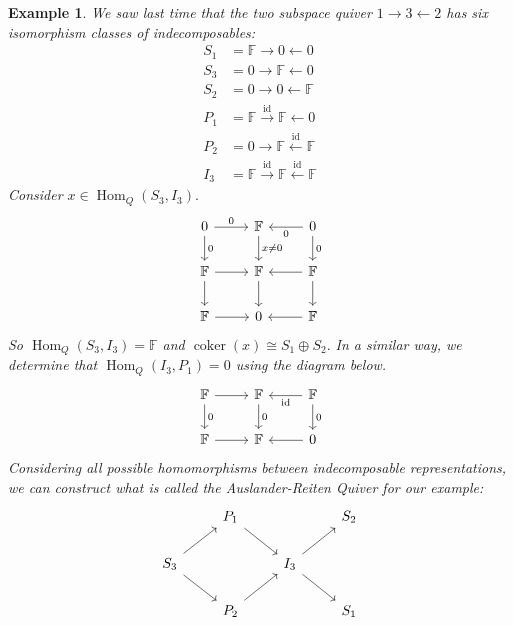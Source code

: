 \documentclass{book}
\newtheorem{example}{Example}[section]
\DeclareMathOperator{\Hom}{Hom}
\DeclareMathOperator{\coker}{coker}
\newcommand{\id}{\mathrm{id}}
\begin{document}
        \begin{example}
            We saw last time that the two subspace quiver $1\to 3 \leftarrow 2$ has six isomorphism classes of indecomposables:
                \begin{align*}
                    S_1 &= \mathbb{F} \to 0 \leftarrow 0 \\
                    S_3 &= 0 \to \mathbb{F} \leftarrow 0 \\
                    S_2 &= 0 \to 0 \leftarrow \mathbb{F} \\
                    P_1 &= \mathbb{F} \xrightarrow{\id} \mathbb{F} \leftarrow 0 \\
                    P_2 &= 0 \to \mathbb{F} \xleftarrow{\id} \mathbb{F} \\
                    I_3 &= \mathbb{F} \xrightarrow{\id} \mathbb{F} \xleftarrow{\id} \mathbb{F}
                \end{align*}
            Consider $x\in \Hom_Q(S_3,I_3).$ 
                \[ \begin{tikzcd}
		            0 \arrow{r}{0} \arrow{d}{0} & \mathbb{F} \arrow{d}{x\neq 0} & 0 \arrow{l}{0}\arrow{d}{0}\\
		            \mathbb{F} \arrow{r} \arrow{d} & \mathbb{F}\arrow{d} & \arrow{l} \arrow{d}\mathbb{F} \\
		            \mathbb{F} \arrow{r} & 0 & \mathbb{F} \arrow{l}
		        \end{tikzcd}\]
		    So $\Hom_Q(S_3,I_3)=\mathbb{F}$ and $\coker(x)\cong S_1\oplus S_2.$ In a similar way, we determine that $\Hom_Q(I_3,P_1)=0$ using the diagram below. 
		        \[ \begin{tikzcd}
		            \mathbb{F} \arrow{r} \arrow{d}{0} & \mathbb{F} \arrow{d}{0} & \mathbb{F} \arrow{l}{\id}\arrow{d}{0}\\
		            \mathbb{F} \arrow{r} & \mathbb{F} & 0 \arrow{l}
		        \end{tikzcd}\]
		    Considering all possible homomorphisms between indecomposable representations, we can construct what is called the Auslander-Reiten Quiver for our example:
		        \[\begin{tikzcd}
		            & P_1 \arrow{dr} & & S_2 \\
		            S_3 \arrow{ur}\arrow{dr} && I_3 \arrow{ur}\arrow{dr} \\
		            & P_2 \arrow{ur} && S_1
		        \end{tikzcd}\]
        \end{example}
\end{document}
